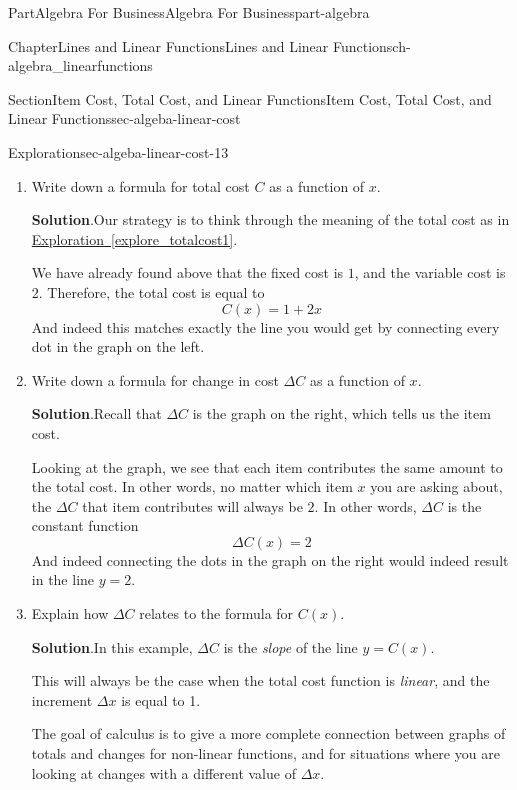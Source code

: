 \documentclass[oneside,10pt,]{tufte-book}
\newcommand{\blocktitlefont}{\relax}
\newcommand{\xreffont}{\relax}
\numberwithin{equation}{chapter}
\begin{document}
\begin{partptx}{Part}{Algebra For Business}{}{Algebra For Business}{}{}{part-algebra}
\begin{chapterptx}{Chapter}{Lines and Linear Functions}{}{Lines and Linear Functions}{}{}{ch-algebra_linearfunctions}
\begin{sectionptx}{Section}{Item Cost, Total Cost, and Linear Functions}{}{Item Cost, Total Cost, and Linear Functions}{}{}{sec-algeba-linear-cost}
\begin{exploration}{Exploration}{}{sec-algeba-linear-cost-13}
\begin{enumerate}[font=\bfseries,label=(\alph*),ref=\alph*]
\par
The graph on the right tells us the variable cost for each item.  As expected, the cost increases by 2\textdollar{} for each item, so the \emph{variable cost} is equal to 2.%
\item{}Write down a formula for total cost \(C\) as a function of \(x\).%
\par\smallskip%
\noindent\textbf{\blocktitlefont Solution}.\hypertarget{sec-algeba-linear-cost-13-3-2}{}\quad{}Our strategy is to think through the meaning of the total cost as in \hyperref[explore_totalcost1]{Exploration~{\xreffont\ref{explore_totalcost1}}}.%
\par
We have already found above that the fixed cost is \(1\), and the variable cost is \(2\).  Therefore, the total cost is equal to%
\begin{equation*}
C(x) = 1 + 2x
\end{equation*}
And indeed this matches exactly the line you would get by connecting every dot in the graph on the left.%
\item{}Write down a formula for change in cost \(\Delta C\) as a function of \(x\).%
\par\smallskip%
\noindent\textbf{\blocktitlefont Solution}.\hypertarget{sec-algeba-linear-cost-13-4-2}{}\quad{}Recall that \(\Delta C\) is the graph on the right, which tells us the item cost.%
\par
Looking at the graph, we see that each item contributes the same amount to the total cost.  In other words, no matter which item \(x\) you are asking about, the \(\Delta C\) that item contributes will always be \(2\). In other words, \(\Delta C\) is the constant function%
\begin{equation*}
\Delta C(x) = 2
\end{equation*}
And indeed connecting the dots in the graph on the right would indeed result in the line \(y=2\).%
\item{}Explain how \(\Delta C\) relates to the formula for \(C(x)\).%
\par\smallskip%
\noindent\textbf{\blocktitlefont Solution}.\hypertarget{sec-algeba-linear-cost-13-5-2}{}\quad{}In this example, \(\Delta C\) is the \emph{slope} of the line \(y=C(x)\).%
\par
This will always be the case when the total cost function is \emph{linear}, and the increment \(\Delta x\) is equal to 1.%
\par
The goal of calculus is to give a more complete connection between graphs of totals and changes for non-linear functions, and for situations where you are looking at changes with a different value of \(\Delta x\).%

\end{enumerate}
\end{exploration}
\end{sectionptx}
\end{chapterptx}
\end{partptx}
\end{document}

